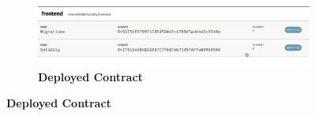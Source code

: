 \documentclass[12pt]{article}
\renewcommand{\_}{\kern-1.5pt\textunderscore\kern-1.5pt}
\begin{document}
\begin{figure}[H]
\begin{minipage}[t]{0.5\linewidth}
	\begin{subfigure}[t]{\textwidth}
	\captionsetup{justification   = raggedright,
              singlelinecheck = false}
		\centering
				\caption*{\textbf{Deployed Contract}}
		\includegraphics[width=\textwidth]{graphs/08. ganache_deployed_contract}
	\end{subfigure}

	\end{minipage}
\end{figure}

\end{document}
